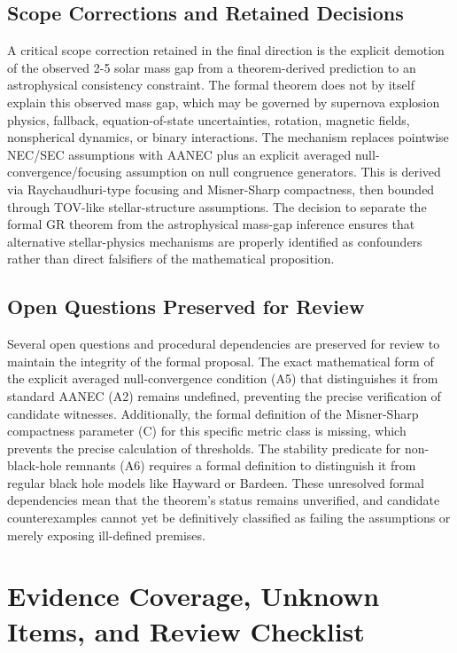 \documentclass[conference]{IEEEtran}
\begin{document}
\subsection{Scope Corrections and Retained Decisions}
A critical scope correction retained in the final direction is the explicit demotion of the observed 2-5 solar mass gap from a theorem-derived prediction to an astrophysical consistency constraint. The formal theorem does not by itself explain this observed mass gap, which may be governed by supernova explosion physics, fallback, equation-of-state uncertainties, rotation, magnetic fields, nonspherical dynamics, or binary interactions. The mechanism replaces pointwise NEC/SEC assumptions with AANEC plus an explicit averaged null-convergence/focusing assumption on null congruence generators. This is derived via Raychaudhuri-type focusing and Misner-Sharp compactness, then bounded through TOV-like stellar-structure assumptions. The decision to separate the formal GR theorem from the astrophysical mass-gap inference ensures that alternative stellar-physics mechanisms are properly identified as confounders rather than direct falsifiers of the mathematical proposition.

\subsection{Open Questions Preserved for Review}
Several open questions and procedural dependencies are preserved for review to maintain the integrity of the formal proposal. The exact mathematical form of the explicit averaged null-convergence condition (A5) that distinguishes it from standard AANEC (A2) remains undefined, preventing the precise verification of candidate witnesses. Additionally, the formal definition of the Misner-Sharp compactness parameter (C) for this specific metric class is missing, which prevents the precise calculation of thresholds. The stability predicate for non-black-hole remnants (A6) requires a formal definition to distinguish it from regular black hole models like Hayward or Bardeen. These unresolved formal dependencies mean that the theorem's status remains unverified, and candidate counterexamples cannot yet be definitively classified as failing the assumptions or merely exposing ill-defined premises.

\section{Evidence Coverage, Unknown Items, and Review Checklist}
\end{document}
